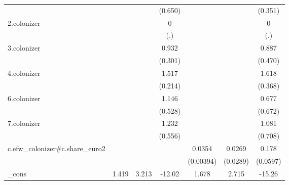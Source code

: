 {\begin{tabular}{l*{6}{c}}
            &                     &                     &     (0.650)         &                     &                     &     (0.351)         \\
[1em]
2.colonizer &                     &                     &           0         &                     &                     &           0         \\
            &                     &                     &         (.)         &                     &                     &         (.)         \\
[1em]
3.colonizer &                     &                     &       0.932\sym{**} &                     &                     &       0.887         \\
            &                     &                     &     (0.301)         &                     &                     &     (0.470)         \\
[1em]
4.colonizer &                     &                     &       1.517\sym{***}&                     &                     &       1.618\sym{**} \\
            &                     &                     &     (0.214)         &                     &                     &     (0.368)         \\
[1em]
6.colonizer &                     &                     &       1.146\sym{*}  &                     &                     &       0.677         \\
            &                     &                     &     (0.528)         &                     &                     &     (0.672)         \\
[1em]
7.colonizer &                     &                     &       1.232\sym{*}  &                     &                     &       1.081         \\
            &                     &                     &     (0.556)         &                     &                     &     (0.708)         \\
[1em]
c.efw\_colonizer#c.share\_euro2&                     &                     &                     &      0.0354\sym{***}&      0.0269         &       0.178\sym{**} \\
            &                     &                     &                     &   (0.00394)         &    (0.0289)         &    (0.0597)         \\
[1em]
\_cons      &       1.419         &       3.213\sym{*}  &      -12.02\sym{*}  &       1.678\sym{*}  &       2.715\sym{*}  &      -15.26\sym{**} \\

\end{tabular}}
